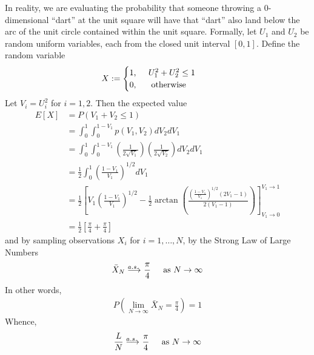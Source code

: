 In reality, we are evaluating the probability that someone throwing a 0-dimensional ``dart'' at the unit square will have that ``dart'' also land below the arc of the unit circle contained within the unit square.  Formally, let $U_1$ and $U_2$ be random uniform variables, each from the closed unit interval $[0, 1]$.  Define the random variable
\begin{align*}
X &:= 
\begin{cases} 
1\text{, } \hspace{.4cm} U_1^2 + U_2^2 \leq 1\\ 
0\text{, \hspace{.4cm} otherwise}
\end{cases}
\end{align*}
Let $V_i = U_i^2$ for $i=1, 2$. Then the expected value
\begin{align*}
E[X] &= P( V_1 + V_2 \leq 1 )\\
     &= \int_0^1 \int_0^{1-V_1} p(V_1, V_2)dV_2 dV_1\\
     &= \int_0^1 \int_0^{1-V_1} \left( \frac{1}{2\sqrt{V_1}} \right) \left( \frac{1}{2\sqrt{V_2}} \right)dV_2 dV_1\\
     &= \frac{1}{2}\int_0^1 \left(\frac{1-V_1}{V_1}\right)^{1/2}dV_1\\
     &= \frac{1}{2} \left[ 
	V_1\left(\frac{1-V_1}{V_1}\right)^{1/2} 
	 - \frac{1}{2} \arctan\left(\frac{\left(\frac{1-V_1}{V_1}\right)^{1/2} (2V_1-1)}{2(V_1-1)}\right) 
	\right]_{V_1\rightarrow 0}^{V_1\rightarrow 1}\\
     &= \frac{1}{2}\left[ \frac{\pi}{4} +\frac{\pi}{4}  \right]
\end{align*}
and by sampling observations $X_i$ for $i=1,\dots,N$, by the Strong Law of Large Numbers
\begin{align*}
\bar{X}_N \longrightarrow^{\hspace{-.55cm} a.s.} \hspace{.1cm} \frac{\pi}{4} \hspace{.4cm} \text{ as } N\rightarrow \infty
\end{align*}
In other words,
\begin{align*}
P\left(\lim_{N\rightarrow\infty} \bar{X}_N = \frac{\pi}{4}\right) = 1
\end{align*}
Whence,
\begin{align*}
\frac{L}{N}  \longrightarrow^{\hspace{-.55cm} a.s.} \hspace{.1cm} \frac{\pi}{4} \hspace{.4cm} \text{ as } N\rightarrow \infty
\end{align*}

